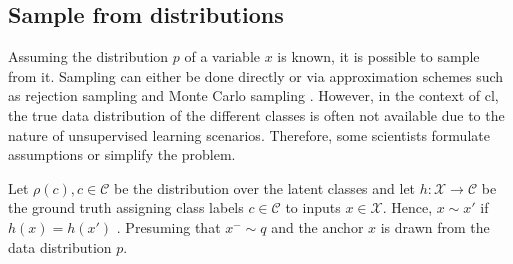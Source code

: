 
\subsection{Sample from distributions}
\label{subsec:SampleViaDistribution}

Assuming the distribution $p$ of a variable $x$ is known, it is possible to sample from it.
Sampling can either be done directly or 
via approximation schemes such as rejection sampling and Monte Carlo sampling \citet{robinson_contrastive_2021}.
However, in the context of \ac{cl}, the true data distribution of the different classes is often not available 
due to the nature of unsupervised learning scenarios.
Therefore, some scientists formulate assumptions or simplify the problem.

Let $\rho(c), c \in \mathcal{C}$ be the distribution over the latent classes and 
let $h: \mathcal{X} \rightarrow \mathcal{C}$ be the ground truth assigning class labels $c \in \mathcal{C}$ to inputs $x \in \mathcal{X}$.
Hence, $x \sim x'$ if $h(x) = h(x')$ \citet{robinson_contrastive_2021,chuang_debiased_2020}.
Presuming that $x^- \sim q$ and the anchor $x$ %
is drawn from the data distribution $p$.








